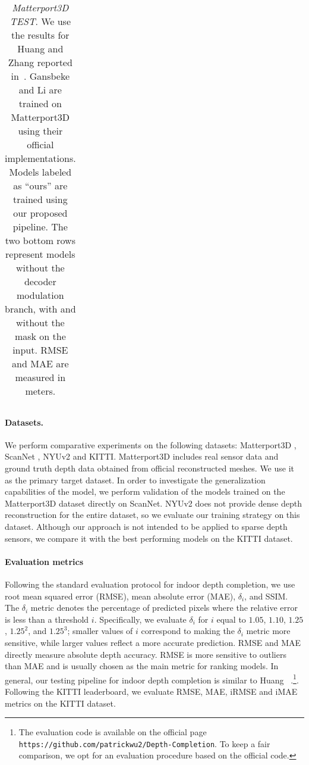 \documentclass[final]{cvpr}
\begin{document}
\begin{table*}[!th]
\begin{tabular}{|c|c|c|c|c|c|c|c|c|}
		\hline
	\end{tabular}
	\vspace{0.1cm}
	\caption{\emph{Matterport3D TEST}. We use the results for Huang \etal \cite{Huang_2019} and Zhang \etal \cite{DBLP:journals/corr/abs-1803-09326} reported in~\cite{Huang_2019}. Gansbeke \etal \cite{wvangansbeke_depth_2019} and Li \etal \cite{msg_chn} are trained on Matterport3D using their official implementations. Models labeled as ``ours'' are trained using our proposed pipeline. The two bottom rows represent models without the decoder modulation branch, with and without the mask on the input. RMSE and MAE are measured in meters.}
	\label{tab:mp3d_test}
    \end{table*}
    
    \paragraph{Datasets.} 
    We perform comparative experiments on the following datasets: Matterport3D \cite{Matterport3D}, ScanNet \cite{dai2017scannet}, NYUv2 \cite{nyuv2} and KITTI\cite{uhrig}. Matterport3D includes real sensor data and ground truth depth data obtained from official reconstructed meshes. We use it as the primary target dataset. In order to investigate the generalization capabilities of the model, we perform validation of the models trained on the Matterport3D dataset directly on ScanNet. NYUv2 does not provide dense depth reconstruction for the entire dataset, so we evaluate our training strategy on this dataset. Although our approach is not intended to be applied to sparse depth sensors, we compare it with the best performing models on the KITTI dataset.
    








    
    \paragraph{Evaluation metrics}
    Following the standard evaluation protocol for indoor depth completion, we use root mean squared error (RMSE), mean absolute error (MAE), $\delta_i$, and SSIM. The $\delta_i$ metric denotes the percentage of predicted pixels where the relative error is less than a threshold $i$. Specifically, we evaluate $\delta_i$ for $i$ equal to $1.05$, $1.10$, $1.25$, $1.25^2$, and $1.25^3$; smaller values of $i$ correspond to making the $\delta_i$ metric more sensitive, while larger values reflect a more accurate prediction. RMSE and MAE directly measure absolute depth accuracy. RMSE is more sensitive to outliers than MAE and is usually chosen as the main metric for ranking models. In general, our testing pipeline for indoor depth completion is similar to Huang \etal~\cite{Huang_2019}.\footnote{The evaluation code is available on the official page \texttt{https://github.com/patrickwu2/Depth-Completion}. To keep a fair comparison, we opt for an evaluation procedure based on the official code.}. Following the KITTI leaderboard, we evaluate RMSE, MAE, iRMSE and iMAE metrics on the KITTI dataset.
    
\end{document}
